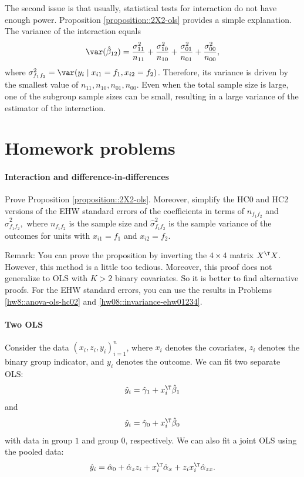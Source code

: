 The second issue is that usually, statistical tests for interaction do not have enough power. Proposition \ref{proposition::2X2-ols} provides a simple explanation. The variance of the interaction equals
$$
\var(\hat{\beta}_{12}) = \frac{\sigma_{11}^2}{n_{11}} + \frac{\sigma_{10}^2}{n_{10}}  +\frac{\sigma_{01}^2}{n_{01}}  +\frac{\sigma_{00}^2}{n_{00}} ,
$$
where $\sigma^2_{f_1f_2} = \var(y_i \mid x_{i1}   = f_1, x_{i2} = f_2)$. 
Therefore, its variance is driven by the smallest value of $n_{11}, n_{10}, n_{01}, n_{00}$. Even when the total sample size is large, one of the subgroup sample sizes can be small, resulting in a large variance of the estimator of the interaction. 



\section{Homework problems}

\paragraph{Interaction and difference-in-differences}\label{hw15interaction::2X2ols}

Prove Proposition \ref{proposition::2X2-ols}. Moreover, simplify the HC0 and HC2 versions of the EHW standard errors of the coefficients in terms of $n_{f_1 f_2}$ and $\hat \sigma^2_{f_1f_2} ,$ where $n_{f_1 f_2}$ is the sample size and $\hat \sigma^2_{f_1f_2}$ is the sample variance of the outcomes for units with $x_{i1} = f_1$ and $x_{i2} = f_2$. 


Remark: You can prove the proposition by inverting the $4\times 4$ matrix $X^{\T} X$. However, this method is a little too tedious. Moreover, this proof does not generalize to OLS with $K > 2$ binary covariates. So it is better to find alternative proofs.
For the EHW standard errors, you can use the results in Problems \ref{hw8::anova-ols-hc02} and \ref{hw08::invariance-ehw01234}. 



\paragraph{Two OLS}\label{hw15interaction::2ols}

Consider the data $(x_i, z_i, y_i)_{i=1}^n$, where $x_i$ denotes the covariates, $z_i$ denotes the binary group indicator, and $y_i$ denotes the outcome. We can fit two separate OLS:
$$
\hat{y}_i =  \hat\gamma_1 + x_i^{\T} \hat \beta_1
$$
and
$$
\hat{y}_i =   \hat   \gamma_0 + x_i^{\T} \hat \beta_0
$$
with  data in group $1$ and group $0$, respectively. We can also fit a joint OLS using the pooled data:
$$
\hat{y}_i =   \hat \alpha_0 + \hat\alpha_z z_i + x_i^{\T} \hat\alpha_x  +  z_i x_i^{\T} \hat\alpha_{zx}.
$$


